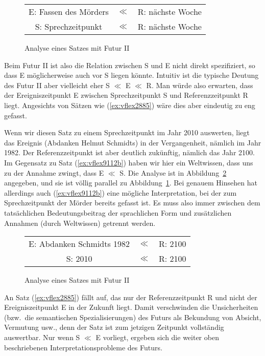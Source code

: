 \begin{figure}
  \centering
  \begin{tabular}{ccc}
    E: Fassen des Mörders & $\ll$ & R: nächste Woche \\
    S: Sprechzeitpunkt & $\ll$ & R: nächste Woche \\
  \end{tabular}
  \caption{Analyse eines Satzes mit Futur II}
  \label{fig:reif2-bsp}
\end{figure}

Beim Futur II ist also die Relation zwischen S und E nicht direkt spezifiziert, so dass E möglicherweise auch vor S liegen könnte.
Intuitiv ist die typische Deutung des Futur II aber vielleicht eher S $\ll$ E $\ll$ R.
Man würde also erwarten, dass der Ereigniszeitpunkt E zwischen Sprechzeitpunkt S und Referenzzeitpunkt R liegt.
Angesichts von Sätzen wie (\ref{ex:vflex2885}) wäre dies aber eindeutig zu eng gefasst.

\begin{exe}
\end{exe}

Wenn wir diesen Satz zu einem Sprechzeitpunkt im Jahr 2010 auswerten, liegt das Ereignis (Abdanken Helmut Schmidts) in der Vergangenheit, nämlich im Jahr 1982.
Der Referenzzeitpunkt ist aber deutlich zukünftig, nämlich das Jahr 2100.
Im Gegensatz zu Satz (\ref{ex:vflex9112b}) haben wir hier ein Weltwissen, dass uns zu der Annahme zwingt, dass E $\ll$ S.
Die Analyse ist in Abbildung~\ref{fig:reif2-bsp2} angegeben, und sie ist völlig parallel zu Abbildung~\ref{fig:reif2-bsp}.
Bei genauem Hinsehen hat allerdings auch (\ref{ex:vflex9112b}) eine mögliche Interpretation, bei der zum Sprechzeitpunkt der Mörder bereits gefasst ist.
Es muss also immer zwischen dem tatsächlichen Bedeutungsbeitrag der sprachlichen Form und zusätzlichen Annahmen (\zB durch Weltwissen) getrennt werden.

\begin{figure}
  \centering
  \begin{tabular}{ccc}
    E: Abdanken Schmidts 1982 & $\ll$ & R: 2100 \\
    S: 2010 & $\ll$ & R: 2100 \\
  \end{tabular}
  \caption{Analyse eines Satzes mit Futur II}
  \label{fig:reif2-bsp2}
\end{figure}

An Satz (\ref{ex:vflex2885}) fällt auf, das nur der Referenzzeitpunkt R und nicht der Ereigniszeitpunkt E in der Zukunft liegt.
Damit verschwinden die Unsicherheiten (bzw.\ die semantischen Spezialisierungen) des Futurs als Bekundung von Absicht, Vermutung usw., denn der Satz ist zum jetzigen Zeitpunkt vollständig auswertbar.
Nur wenn S $\ll$ E vorliegt, ergeben sich die weiter oben beschriebenen Interpretationsprobleme des Futurs.

